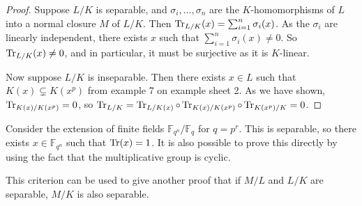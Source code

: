 \begin{proof}
	Suppose \( L / K \) is separable, and \( \sigma_i, \dots, \sigma_n \) are the \( K \)-homomorphisms of \( L \) into a normal closure \( M \) of \( L / K \).
	Then \( \Tr_{L/K}(x) = \sum_{i=1}^n \sigma_i(x) \).
	As the \( \sigma_i \) are linearly independent, there exists \( x \) such that \( \sum_{i=1}^n \sigma_i(x) \neq 0 \).
	So \( \Tr_{L/K}(x) \neq 0 \), and in particular, it must be surjective as it is \( K \)-linear.

	Now suppose \( L / K \) is inseparable.
	Then there exists \( x \in L \) such that \( K(x) \subsetneq K(x^p) \) from example 7 on example sheet 2.
	As we have shown, \( \Tr_{K(x)/K(x^p)} = 0 \), so \( \Tr_{L/K} = \Tr_{L/K(x)} \circ \Tr_{K(x)/K(x^p)} \circ \Tr_{K(x^p)/K} = 0 \).
\end{proof}
\begin{example}
	Consider the extension of finite fields \( \mathbb F_{q^n} / \mathbb F_q \) for \( q = p^r \).
	This is separable, so there exists \( x \in \mathbb F_{q^n} \) such that \( \Tr(x) = 1 \).
	It is also possible to prove this directly by using the fact that the multiplicative group is cyclic.
\end{example}
\begin{remark}
	This criterion can be used to give another proof that if \( M / L \) and \( L / K \) are separable, \( M / K \) is also separable.
\end{remark}
